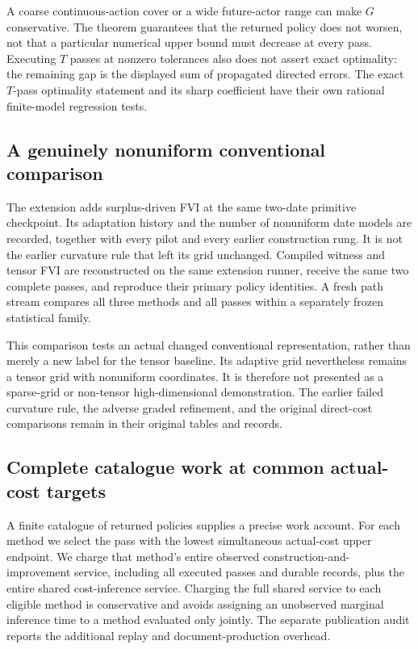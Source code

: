 A coarse continuous-action cover or a wide future-actor range can make $G$ conservative. The theorem guarantees that the returned policy does not worsen, not that a particular numerical upper bound must decrease at every pass. Executing $T$ passes at nonzero tolerances also does not assert exact optimality: the remaining gap is the displayed sum of propagated directed errors. The exact $T$-pass optimality statement and its sharp coefficient have their own rational finite-model regression tests.

\subsection{A genuinely nonuniform conventional comparison}
The extension adds surplus-driven FVI at the same two-date primitive checkpoint. Its adaptation history and the number of nonuniform date models are recorded, together with every pilot and every earlier construction rung. It is not the earlier curvature rule that left its grid unchanged. Compiled witness and tensor FVI are reconstructed on the same extension runner, receive the same two complete passes, and reproduce their primary policy identities. A fresh path stream compares all three methods and all passes within a separately frozen statistical family.



This comparison tests an actual changed conventional representation, rather than merely a new label for the tensor baseline. Its adaptive grid nevertheless remains a tensor grid with nonuniform coordinates. It is therefore not presented as a sparse-grid or non-tensor high-dimensional demonstration. The earlier failed curvature rule, the adverse graded refinement, and the original direct-cost comparisons remain in their original tables and records.

\subsection{Complete catalogue work at common actual-cost targets}
A finite catalogue of returned policies supplies a precise work account. For each method we select the pass with the lowest simultaneous actual-cost upper endpoint. We charge that method's entire observed construction-and-improvement service, including all executed passes and durable records, plus the entire shared cost-inference service. Charging the full shared service to each eligible method is conservative and avoids assigning an unobserved marginal inference time to a method evaluated only jointly. The separate publication audit reports the additional replay and document-production overhead.

